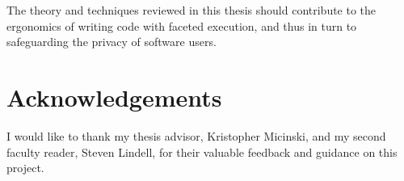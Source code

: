 \documentclass{article}
\begin{document}
The theory and techniques reviewed in this thesis should contribute to the ergonomics of writing code with faceted execution, and thus in turn to safeguarding the privacy of software users.



\section*{Acknowledgements}
I would like to thank my thesis advisor, Kristopher Micinski, and my second faculty reader, Steven Lindell, for their valuable feedback and guidance on this project.




\end{document}
